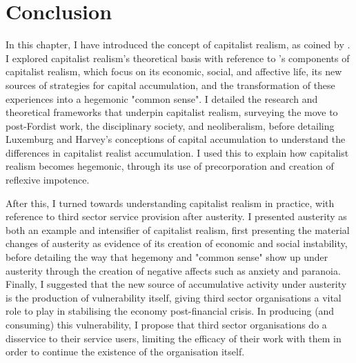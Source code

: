 \section{Conclusion}
In this chapter, I have introduced the concept of capitalist realism, as coined by \citet{fisher_capitalist_2009}. I explored capitalist realism's theoretical basis with reference to \citet{shonkwiler_reading_2014}'s components of capitalist realism, which focus on its economic, social, and affective life, its new sources of strategies for capital accumulation, and the transformation of these experiences into a hegemonic "common sense". I detailed the research and theoretical frameworks that underpin capitalist realism, surveying the move to post-Fordist work, the disciplinary society, and neoliberalism, before detailing Luxemburg and Harvey's conceptions of capital accumulation to understand the differences in capitalist realist accumulation. I used this to explain how capitalist realism becomes hegemonic, through its use of precorporation and creation of reflexive impotence. 

After this, I turned towards understanding capitalist realism in practice, with reference to third sector service provision after austerity. I presented austerity as both an example and intensifier of capitalist realism, first presenting the material changes of austerity as evidence of its creation of economic and social instability, before detailing the way that hegemony and "common sense" show up under austerity through the creation of negative affects such as anxiety and paranoia. Finally, I suggested that the new source of accumulative activity under austerity is the production of vulnerability itself, giving third sector organisations a vital role to play in stabilising the economy post-financial crisis. In producing (and consuming) this vulnerability, I propose that third sector organisations do a disservice to their service users, limiting the efficacy of their work with them in order to continue the existence of the organisation itself. 

